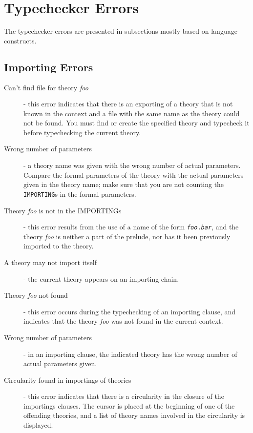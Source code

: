 \section{Typechecker Errors}

The typechecker errors are presented in subsections mostly based on
language constructs.

\subsection{Importing Errors}

\begin{description}

\item[Can't find file for theory \emph{foo}] - this error indicates that
there is an exporting of a theory that is not known in the context and a
file with the same name as the theory could not be found.  You must find
or create the specified theory and typecheck it before typechecking the
current theory.

\item[Wrong number of parameters] - a theory name was given with the wrong
number of actual parameters.  Compare the formal parameters of the theory
with the actual parameters given in the theory name; make sure that you
are not counting the \texttt{IMPORTING}s in the formal parameters.

\item[Theory {\em foo} is not in the IMPORTINGs] - this error results from
the use of a name of the form \texttt{\emph{foo}.\emph{bar}}, and the
theory \emph{foo} is neither a part of the prelude, nor has it been
previously imported to the theory.

\item[A theory may not import itself] - the current theory appears on an
importing chain.

\item[Theory {\em foo\/} not found] - this error occurs during the
typechecking of an importing clause, and indicates that the theory
\emph{foo} was not found in the current context.

\item[Wrong number of parameters] - in an importing clause, the indicated
theory has the wrong number of actual parameters given.

\item[Circularity found in importings of theories] - this error indicates
that there is a circularity in the closure of the importings clauses.  The
cursor is placed at the beginning of one of the offending theories, and a
list of theory names involved in the circularity is displayed.

\end{description}



